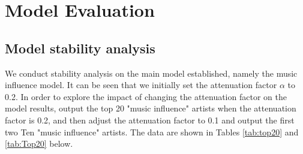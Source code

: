 \documentclass[12pt]{article}  %
\begin{document}
%

\section{Model Evaluation}
\subsection{Model stability analysis}

We conduct stability analysis on the main model established, namely the music influence model. It can be seen that we initially set the attenuation factor $\alpha$ to 0.2. In order to explore the impact of changing the attenuation factor on the model results, output the top 20 "music influence" artists when the attenuation factor is 0.2, and then adjust the attenuation factor to 0.1 and output the first two Ten "music influence" artists. The data are shown in Tables \ref{tab:top20} and  \ref{tab:Top20} below.
\end{document}

